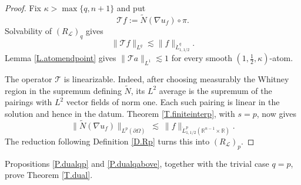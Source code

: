 \documentclass[12pt,leqno]{amsart}
\numberwithin{equation}{section}
\newcommand{\R}{\mathbb R}
\newcommand{\pom}{\partial\Omega}
\newcommand{\LL}{\mathcal L}
\newcommand{\Nt}{\widetilde N}
\theoremstyle{plain}
\theoremstyle{remark}
\begin{document}
\begin{proof}
Fix $\kappa>\max\{q,n+1\}$ and put
\[
 \mathcal Tf:=\Nt(\nabla u_f)\circ\pi.
\]
Solvability of $(R_{\LL})_q$ gives
\[
 \|\mathcal Tf\|_{L^q}\lesssim\|f\|_{\dot L^q_{1,1/2}}.
\]
Lemma \ref{L.atomendpoint} gives $\|\mathcal Ta\|_{L^1}\lesssim1$ for every
smooth $(1,\tfrac12,\kappa)$-atom.

The operator $\mathcal T$ is linearizable. Indeed, after choosing measurably
the Whitney region in the supremum defining $\Nt$, its $L^2$ average is the
supremum of the pairings with $L^2$ vector fields of norm one. Each such
pairing is linear in the solution and hence in the datum. Theorem
\ref{T.finiteinterp}, with $s=p$, now gives
\[
 \|\Nt(\nabla u_f)\|_{L^p(\pom)}
 \ \lesssim\ \|f\|_{\dot L^p_{1,1/2}(\R^{n-1}\times\R)}.
\]
The reduction following Definition \ref{D.Rp} turns this into
$(R_{\LL})_p$.
\end{proof}

Propositions \ref{P.dualqp} and \ref{P.dualqabove}, together with the trivial
case $q=p$, prove Theorem \ref{T.dual}.
\end{document}
